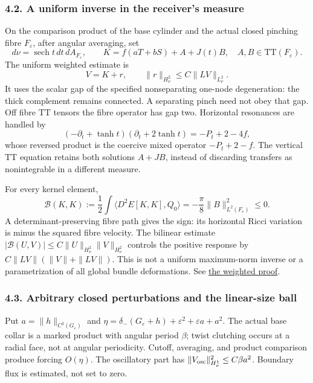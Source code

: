 \documentclass[
  english,
]{article}
\begin{document}
\hypertarget{a-uniform-inverse-in-the-receivers-measure}{%
\subsubsection{4.2. A uniform inverse in the receiver's
measure}\label{a-uniform-inverse-in-the-receivers-measure}}

On the comparison product of the base cylinder and the actual closed
pinching fibre \(F_\varepsilon\), after angular averaging, set \[
d\nu=\operatorname{sech}t\,dt\,dA_{F_\varepsilon},\qquad
K=f(aT+bS)+A+J(t)B,\quad A,B\in\mathrm{TT}(F_\varepsilon).
\] The uniform weighted estimate is \[
V=K+r,\qquad \|r\|_{H^2_\nu}\le C\|LV\|_{L^2_\nu}.
\tag{4.2}
\] It uses the scalar gap of the specified nonseparating one-node
degeneration: the thick complement remains connected. A separating pinch
need not obey that gap. Off fibre TT tensors the fibre operator has gap
two. Horizontal resonances are handled by \[
(-\partial_t+\tanh t)(\partial_t+2\tanh t)=-P_t+2-4f,
\] whose reversed product is the coercive mixed operator \(-P_t+2-f\).
The vertical TT equation retains both solutions \(A+JB\), instead of
discarding transfers as nonintegrable in a different measure.

For every kernel element, \[
\mathcal B(K,K):=\frac12\int
\langle D^2E[K,K],Q_0\rangle
=-\frac{\pi}{8}\|B\|_{L^2(F_\varepsilon)}^2\le0.
\tag{4.3}
\] A determinant-preserving fibre path gives the sign: its horizontal
Ricci variation is minus the squared fibre velocity. The bilinear
estimate \(|\mathcal B(U,V)|\le C\|U\|_{H^2_\nu}\|V\|_{H^2_\nu}\)
controls the positive response by \(C\|LV\|(\|V\|+\|LV\|)\). This is not
a uniform maximum-norm inverse or a parametrization of all global bundle
deformations. See \href{../proofs/round6_weighted_inverse.md}{the
weighted proof}.

\hypertarget{arbitrary-closed-perturbations-and-the-linear-size-ball}{%
\subsubsection{4.3. Arbitrary closed perturbations and the linear-size
ball}\label{arbitrary-closed-perturbations-and-the-linear-size-ball}}

Put \(a=\|h\|_{C^2(G_\varepsilon)}\) and
\(\eta=\delta_-(G_\varepsilon+h)+\varepsilon^2+\varepsilon a+a^2\). The
actual base collar is a marked product with angular period \(\beta\);
twist clutching occurs at a radial face, not at angular periodicity.
Cutoff, averaging, and product comparison produce forcing \(O(\eta)\).
The oscillatory part has \(\|V_{\rm osc}\|_{H^1_\nu}^2\le C\beta a^2\).
Boundary flux is estimated, not set to zero.
\end{document}
